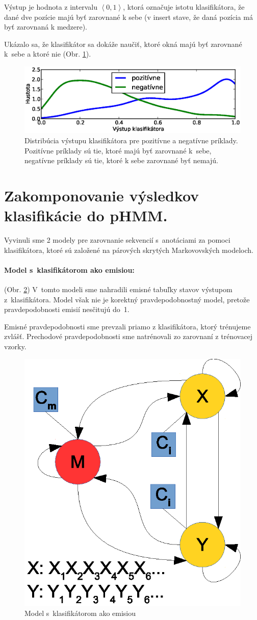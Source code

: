\documentclass[myposter,portrait]{sciposter}
\def\mysection#1{
{\color{SectionCol}\section*{\sc\bfseries #1}}}
\begin{document}
\begin{multicols*}{3}
Výstup je hodnota z intervalu $\left<0,1\right>$, ktorá označuje istotu klasifikátora, že dané dve pozície majú byť zarovnané k sebe (v insert stave, že daná pozícia má byť zarovnaná k medzere).

Ukázalo sa, že klasifikátor sa dokáže naučiť, ktoré okná majú byť zarovnané k~sebe a ktoré nie (Obr. \ref{fig:clf-m-dist}).

\begin{figure}[htp]
    \centering
    \includegraphics[width=\textwidth, clip=true]{images/clf_m_test}
    \caption{Distribúcia výstupu klasifikátora pre pozitívne a negatívne príklady. Pozitívne príklady sú tie, ktoré majú byť zarovnané k~sebe, negatívne príklady sú tie, ktoré k sebe zarovnané byť nemajú.}
    \label{fig:clf-m-dist}
\end{figure}

\mysection{Zakomponovanie výsledkov klasifikácie do pHMM.}

Vyvinuli sme 2 modely pre zarovnanie sekvencií s~anotáciami za pomoci klasifikátora, ktoré sú založené na párových skrytých Markovovských modeloch.

\paragraph{Model s~klasifikátorom ako emisiou:} (Obr. \ref{fig:model-clf})
V~tomto modeli sme nahradili emisné tabuľky stavov výstupom z~klasifikátora.
Model však nie je korektný pravdepodobnostný model, pretože pravdepodobnosti emisií nesčitujú do~1.

Emisné pravdepodobnosti sme prevzali priamo z klasifikátora, ktorý trénujeme zvlášť. Prechodové pravdepodobnosti sme natrénovali zo zarovnaní z trénovacej vzorky.

\begin{figure}[htp]
        \centering
        \includegraphics[width=.5\textwidth, clip=true]{images/model_clf}
        \caption{Model s~klasifikátorom ako emisiou}
        \label{fig:model-clf}
\end{figure}



\end{multicols*}
\end{document}
